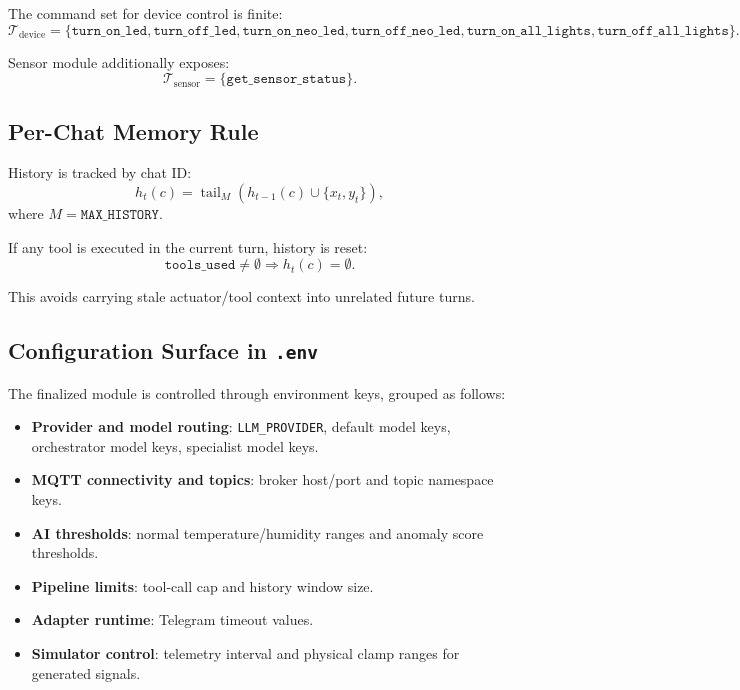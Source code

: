 The command set for device control is finite:
\begin{equation}
\label{eq:tool-set}
\mathcal{T}_{\text{device}} =
\{\texttt{turn\_on\_led},\texttt{turn\_off\_led},
\texttt{turn\_on\_neo\_led},\texttt{turn\_off\_neo\_led},
\texttt{turn\_on\_all\_lights},\texttt{turn\_off\_all\_lights}\}.
\end{equation}

Sensor module additionally exposes:
\begin{equation}
\label{eq:sensor-tool}
\mathcal{T}_{\text{sensor}} = \{\texttt{get\_sensor\_status}\}.
\end{equation}

\subsection{Per-Chat Memory Rule}
\label{sec:mas-history}

History is tracked by chat ID:
\begin{equation}
\label{eq:history-window}
    h_t(c) = \operatorname{tail}_{M}(h_{t-1}(c) \cup \{x_t, y_t\}),
\end{equation}
where $M=\texttt{MAX\_HISTORY}$.

If any tool is executed in the current turn, history is reset:
\begin{equation}
\label{eq:history-reset}
    \texttt{tools\_used} \neq \emptyset \Rightarrow h_t(c)=\emptyset.
\end{equation}

This avoids carrying stale actuator/tool context into unrelated future
turns.

\subsection{Configuration Surface in \texttt{.env}}
\label{sec:mas-config}

The finalized module is controlled through environment keys, grouped
as follows:
\begin{itemize}
    \item \textbf{Provider and model routing}: \texttt{LLM\_PROVIDER},
          default model keys, orchestrator model keys, specialist model
          keys.
    \item \textbf{MQTT connectivity and topics}: broker host/port and
          topic namespace keys.
    \item \textbf{AI thresholds}: normal temperature/humidity ranges and
          anomaly score thresholds.
    \item \textbf{Pipeline limits}: tool-call cap and history window size.
    \item \textbf{Adapter runtime}: Telegram timeout values.
    \item \textbf{Simulator control}: telemetry interval and physical
          clamp ranges for generated signals.
\end{itemize}

